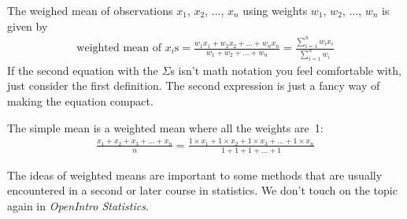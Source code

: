 \begin{termBox}{
The weighed mean of observations $x_1$, $x_2$, ..., $x_n$ using weights $w_1$, $w_2$, ..., $w_n$ is given by
\begin{align*}
\text{weighted mean of $x_i$s} = 
\frac{w_{1}x_{1} + w_{2}x_{2} + \dots + w_{n}x_{n}}
	{w_{1} + w_{2} + \dots + w_{n}} = 
\frac{\sum_{i=1}^n w_{i}x_{i}}
	{\sum_{i=1}^n w_{i}}
\end{align*}
If the second equation with the $\Sigma$s isn't math notation you feel comfortable with, just consider the first definition. The second expression is just a fancy way of making the equation compact.}\end{termBox}

\begin{tipBox}{
The simple mean is a weighted mean where all the weights are~1:
\begin{align*}
\frac{x_{1} + x_{2} + x_{3} + \dots + x_{n}}
	{n}
= \frac{1\times x_{1} + 1\times x_{2} + 1\times x_{3} + \dots + 1\times x_{n}}
	{1 + 1 + 1 + \dots + 1}
\end{align*}
}\end{tipBox}
The ideas of weighted means are important to some methods that are usually encountered in a second or later course in statistics. We don't touch on the topic again in \emph{OpenIntro Statistics}.

